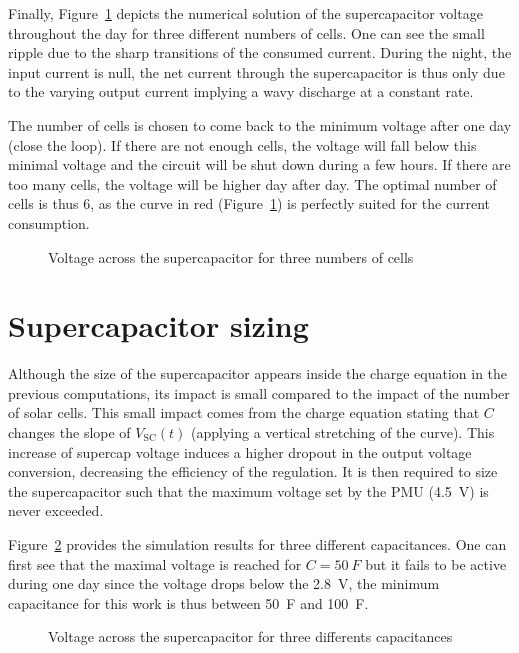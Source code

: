 \documentclass{EPL-master-thesis-covers-EN}
\newcommand{\te}[1]{\textrm{#1}}
\begin{document}
Finally, Figure~\ref{fig:Supercap_voltage} depicts the numerical solution of the supercapacitor voltage throughout the day for three different numbers of cells. One can see the small ripple due to the sharp transitions of the consumed current. During the night, the input current is null, the net current through the supercapacitor is thus only due to the varying output current implying a wavy discharge at a constant rate.

The number of cells is chosen to come back to the minimum voltage after one day (close the loop). If there are not enough cells, the voltage will fall below this minimal voltage and the circuit will be shut down during a few hours. If there are too many cells, the voltage will be higher day after day. The optimal number of cells is thus 6, as the curve in red (Figure~\ref{fig:Supercap_voltage}) is perfectly suited for the current consumption.

\begin{figure}[H]
    \centering
    
    \caption{Voltage across the supercapacitor for three numbers of cells}
    \label{fig:Supercap_voltage}
\end{figure}

\section{Supercapacitor sizing}
\label{supercap_sizing}

Although the size of the supercapacitor appears inside the charge equation in the previous computations, its impact is small compared to the impact of the number of solar cells. This small impact comes from the charge equation stating that $C$ changes the slope of $V_\te{SC}(t)$ (applying a vertical stretching of the curve). This increase of supercap voltage induces a higher dropout in the output voltage conversion, decreasing the efficiency of the regulation. It is then required to size the supercapacitor such that the maximum voltage set by the PMU (\SI{4.5}{V}) is never exceeded.

Figure~\ref{fig:Supercap_voltage_C} provides the simulation results for three different capacitances. One can first see that the maximal voltage is reached for $C = \SI{50}{F}$ but it fails to be active during one day since the voltage drops below the \SI{2.8}{V}, the minimum capacitance for this work is thus between \SI{50}{F} and \SI{100}{F}.

\begin{figure}[H]
    \centering
    
    \caption{Voltage across the supercapacitor for three differents capacitances}
    \label{fig:Supercap_voltage_C}
\end{figure}
\end{document}
